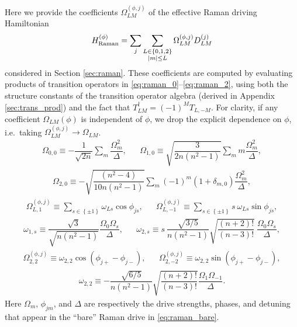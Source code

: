 \documentclass[nofootinbib,notitlepage,11pt]{revtex4-2}
\renewcommand{\t}{\text} %
\newcommand{\f}[2]{\dfrac{#1}{#2}} %
\newcommand{\p}[1]{\left(#1\right)} %
\renewcommand{\set}[1]{\left\{#1\right\}} %
\newcommand{\1}{\mathds{1}}
\begin{document}
Here we provide the coefficients $\Omega_{LM}^{(\phi,j)}$ of the
effective Raman driving Hamiltonian
\begin{align}
  H_{\t{Raman}}^{(\phi)}
  = \sum_j \sum_{\substack{L\in\set{0,1,2}\\\abs{m}\le L}}
  \Omega_{LM}^{(\phi,j)} D_{LM}^{(j)}
\end{align}
considered in Section \ref{sec:raman}.  These coefficients are
computed by evaluating products of transition operators in
\eqref{eq:raman_0}--\eqref{eq:raman_2}, using both the structure
constants of the transition operator algebra (derived in Appendix
\ref{sec:trans_prod}) and the fact that
$T_{LM}^\dag = \p{-1}^M T_{L,-M}$.  For clarity, if any coefficient
$\Omega_{LM}\p{\phi}$ is independent of $\phi$, we drop the explicit
dependence on $\phi$, i.e.~taking
$\Omega_{LM}^{(\phi,j)}\to\Omega_{LM}$.
\begin{align}
  \Omega_{0,0} \equiv -\f1{\sqrt{2n}} \sum_m\f{\Omega_m^2}{\Delta},
  &&
  \Omega_{1,0} \equiv \sqrt{\f{3}{2n\p{n^2-1}}}
  \sum_m m\f{\Omega_m^2}{\Delta},
\end{align}
\begin{align}
  \Omega_{2,0} \equiv -\sqrt{\f{\p{n^2-4}}{10n\p{n^2-1}}}
  \sum_m \p{-1}^m \p{1+\delta_{m,0}} \f{\Omega_m^2}{\Delta},
\end{align}
\begin{align}
  \Omega_{L,1}^{(\phi,j)}
  \equiv \sum_{s\in\set{\pm1}} \omega_{Ls} \cos\phi_{js},
  &&
  \Omega_{L,-1}^{(\phi,j)}
  \equiv \sum_{s\in\set{\pm1}} s~ \omega_{Ls} \sin\phi_{js},
\end{align}
\begin{align}
  \omega_{1,s} \equiv \f{\sqrt3}{\sqrt{n\p{n^2-1}}}
  \f{\Omega_0 \Omega_s}{\Delta},
  &&
  \omega_{2,s} \equiv s~ \f{\sqrt{3/5}}{n\p{n^2-1}}
  \sqrt{\f{\p{n+2}!}{\p{n-3}!}}~ \f{\Omega_0\Omega_s}{\Delta},
\end{align}
\begin{align}
  \Omega_{2,2}^{(\phi,j)}
  \equiv \omega_{2,2} \cos\p{\phi_{j+}-\phi_{j-}},
  &&
  \Omega_{2,-2}^{(\phi,j)}
  \equiv \omega_{2,2} \sin\p{\phi_{j+}-\phi_{j-}},
\end{align}
\begin{align}
  \omega_{2,2} \equiv -\f{\sqrt{6/5}}{n\p{n^2-1}}
  \sqrt{\f{\p{n+2}!}{\p{n-3}!}} \f{\Omega_1\Omega_{-1}}{\Delta}.
\end{align}
Here $\Omega_m$, $\phi_{jm}$, and $\Delta$ are respectively the drive
strengths, phases, and detuning that appear in the ``bare'' Raman
drive in \eqref{eq:raman_bare}.



\end{document}
